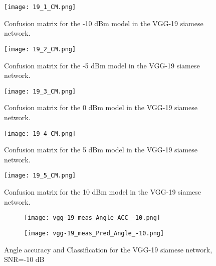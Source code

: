   \begin{figure}[htbp!]
    \centering
    \texttt{[image: 19\_1\_CM.png]}
    \caption[VGG-19, -10 dBm Confusion Matrix]{Confusion matrix for the -10 dBm model in the VGG-19 siamese network.}
    \label{fig:vgg-19_cm1}
  \end{figure}

  \begin{figure}[htbp!]
    \centering
    \texttt{[image: 19\_2\_CM.png]}
    \caption[VGG-19, -5 dBm Confusion Matrix]{Confusion matrix for the -5 dBm model in the VGG-19 siamese network.}
    \label{fig:vgg-19_cm2}
  \end{figure}

  \begin{figure}[htbp!]
    \centering
    \texttt{[image: 19\_3\_CM.png]}
    \caption[VGG-19, 0 dBm Confusion Matrix]{Confusion matrix for the 0 dBm model in the VGG-19 siamese network.}
    \label{fig:vgg-19_cm3}
  \end{figure}

  \begin{figure}[htbp!]
    \centering
    \texttt{[image: 19\_4\_CM.png]}
    \caption[VGG-19, 5 dBm Confusion Matrix]{Confusion matrix for the 5 dBm model in the VGG-19 siamese network.}
    \label{fig:vgg-19_cm4}
  \end{figure}

  \begin{figure}[htbp!]
    \centering
    \texttt{[image: 19\_5\_CM.png]}
    \caption[VGG-19, 10 dBm Confusion Matrix]{Confusion matrix for the 10 dBm model in the VGG-19 siamese network.}
    \label{fig:vgg-19_cm5}
  \end{figure}

  \begin{figure}[htbp]
    \centering
    \begin{subfigure}{.5\textwidth}
      \centering
      \texttt{[image: vgg-19\_meas\_Angle\_ACC\_-10.png]}
    \end{subfigure}%
    \begin{subfigure}{.5\textwidth}
      \centering
      \texttt{[image: vgg-19\_meas\_Pred\_Angle\_-10.png]}
    \end{subfigure}
    \caption{Angle accuracy and Classification for the VGG-19 siamese network, SNR=-10 dB}
    \label{fig:vgg-19_snr1}
  \end{figure}

